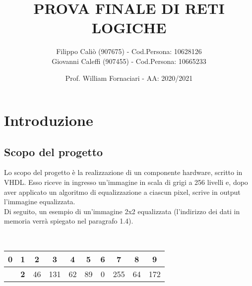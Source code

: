 \documentclass[12pt, table, xcdraw]{article}
\title{PROVA FINALE DI RETI LOGICHE}
\date{Prof. William Fornaciari - AA: 2020/2021}
\author{Filippo Caliò (907675) - Cod.Persona: 10628126 \\ Giovanni Caleffi (907455) - Cod.Persona: 10665233}
\begin{document}
\maketitle
{}
\tableofcontents

\newpage
{}

\section{Introduzione}

\subsection{Scopo del progetto}
Lo scopo del progetto è la realizzazione di un componente hardware, scritto in VHDL. Esso riceve in ingresso un'immagine in scala di grigi a 256 livelli e, dopo aver applicato un algoritmo di equalizzazione a ciascun pixel, scrive in output l'immagine equalizzata.\\
Di seguito, un esempio di un'immagine 2x2 equalizzata (l'indirizzo dei dati in memoria verrà spiegato nel paragrafo 1.4).

\begin{table}[h!]
  \begin{center}
    \
	\begin{tabular}{cccccccccc}
	0                                                        & 1                                                       & 2                                               & 3                                                & 4                                               & 5                                               & 6                                              & 7                                                & 8                                               & 9                                                \\ \hline
	\rowcolor[HTML]{EFEFEF} 
	\multicolumn{1}{|c|}{\cellcolor[HTML]{EFEFEF}\textbf{2}} & \multicolumn{1}{c|}{\cellcolor[HTML]{EFEFEF}\textbf{2}} & \multicolumn{1}{c|}{\cellcolor[HTML]{EFEFEF}46} & \multicolumn{1}{c|}{\cellcolor[HTML]{EFEFEF}131} & \multicolumn{1}{c|}{\cellcolor[HTML]{EFEFEF}62} & \multicolumn{1}{c|}{\cellcolor[HTML]{EFEFEF}89} & \multicolumn{1}{c|}{\cellcolor[HTML]{EFEFEF}0} & \multicolumn{1}{c|}{\cellcolor[HTML]{EFEFEF}255} & \multicolumn{1}{c|}{\cellcolor[HTML]{EFEFEF}64} & \multicolumn{1}{c|}{\cellcolor[HTML]{EFEFEF}172} \\ \hline
	\end{tabular}

  
  \end{center}
\end{table}
\end{document}
